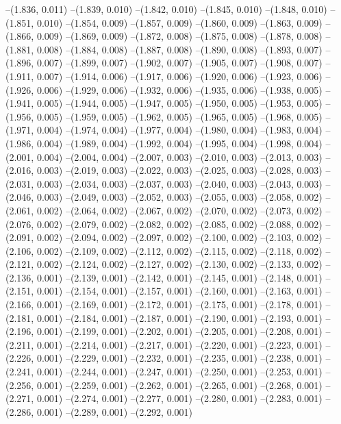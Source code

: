 --(1.836, 0.011)
--(1.839, 0.010)
--(1.842, 0.010)
--(1.845, 0.010)
--(1.848, 0.010)
--(1.851, 0.010)
--(1.854, 0.009)
--(1.857, 0.009)
--(1.860, 0.009)
--(1.863, 0.009)
--(1.866, 0.009)
--(1.869, 0.009)
--(1.872, 0.008)
--(1.875, 0.008)
--(1.878, 0.008)
--(1.881, 0.008)
--(1.884, 0.008)
--(1.887, 0.008)
--(1.890, 0.008)
--(1.893, 0.007)
--(1.896, 0.007)
--(1.899, 0.007)
--(1.902, 0.007)
--(1.905, 0.007)
--(1.908, 0.007)
--(1.911, 0.007)
--(1.914, 0.006)
--(1.917, 0.006)
--(1.920, 0.006)
--(1.923, 0.006)
--(1.926, 0.006)
--(1.929, 0.006)
--(1.932, 0.006)
--(1.935, 0.006)
--(1.938, 0.005)
--(1.941, 0.005)
--(1.944, 0.005)
--(1.947, 0.005)
--(1.950, 0.005)
--(1.953, 0.005)
--(1.956, 0.005)
--(1.959, 0.005)
--(1.962, 0.005)
--(1.965, 0.005)
--(1.968, 0.005)
--(1.971, 0.004)
--(1.974, 0.004)
--(1.977, 0.004)
--(1.980, 0.004)
--(1.983, 0.004)
--(1.986, 0.004)
--(1.989, 0.004)
--(1.992, 0.004)
--(1.995, 0.004)
--(1.998, 0.004)
--(2.001, 0.004)
--(2.004, 0.004)
--(2.007, 0.003)
--(2.010, 0.003)
--(2.013, 0.003)
--(2.016, 0.003)
--(2.019, 0.003)
--(2.022, 0.003)
--(2.025, 0.003)
--(2.028, 0.003)
--(2.031, 0.003)
--(2.034, 0.003)
--(2.037, 0.003)
--(2.040, 0.003)
--(2.043, 0.003)
--(2.046, 0.003)
--(2.049, 0.003)
--(2.052, 0.003)
--(2.055, 0.003)
--(2.058, 0.002)
--(2.061, 0.002)
--(2.064, 0.002)
--(2.067, 0.002)
--(2.070, 0.002)
--(2.073, 0.002)
--(2.076, 0.002)
--(2.079, 0.002)
--(2.082, 0.002)
--(2.085, 0.002)
--(2.088, 0.002)
--(2.091, 0.002)
--(2.094, 0.002)
--(2.097, 0.002)
--(2.100, 0.002)
--(2.103, 0.002)
--(2.106, 0.002)
--(2.109, 0.002)
--(2.112, 0.002)
--(2.115, 0.002)
--(2.118, 0.002)
--(2.121, 0.002)
--(2.124, 0.002)
--(2.127, 0.002)
--(2.130, 0.002)
--(2.133, 0.002)
--(2.136, 0.001)
--(2.139, 0.001)
--(2.142, 0.001)
--(2.145, 0.001)
--(2.148, 0.001)
--(2.151, 0.001)
--(2.154, 0.001)
--(2.157, 0.001)
--(2.160, 0.001)
--(2.163, 0.001)
--(2.166, 0.001)
--(2.169, 0.001)
--(2.172, 0.001)
--(2.175, 0.001)
--(2.178, 0.001)
--(2.181, 0.001)
--(2.184, 0.001)
--(2.187, 0.001)
--(2.190, 0.001)
--(2.193, 0.001)
--(2.196, 0.001)
--(2.199, 0.001)
--(2.202, 0.001)
--(2.205, 0.001)
--(2.208, 0.001)
--(2.211, 0.001)
--(2.214, 0.001)
--(2.217, 0.001)
--(2.220, 0.001)
--(2.223, 0.001)
--(2.226, 0.001)
--(2.229, 0.001)
--(2.232, 0.001)
--(2.235, 0.001)
--(2.238, 0.001)
--(2.241, 0.001)
--(2.244, 0.001)
--(2.247, 0.001)
--(2.250, 0.001)
--(2.253, 0.001)
--(2.256, 0.001)
--(2.259, 0.001)
--(2.262, 0.001)
--(2.265, 0.001)
--(2.268, 0.001)
--(2.271, 0.001)
--(2.274, 0.001)
--(2.277, 0.001)
--(2.280, 0.001)
--(2.283, 0.001)
--(2.286, 0.001)
--(2.289, 0.001)
--(2.292, 0.001)
